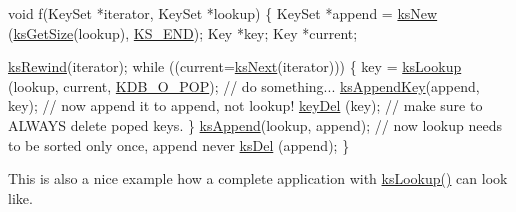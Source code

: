 \begin{DoxyCodeInclude}
\textcolor{keywordtype}{void} f(KeySet *iterator, KeySet *lookup)
\{
        KeySet *append = \hyperlink{group__keyset_ga671e1aaee3ae9dc13b4834a4ddbd2c3c}{ksNew} (\hyperlink{group__keyset_ga7474ad6b0a0fa969dbdf267ba5770eee}{ksGetSize}(lookup), \hyperlink{kdbenum_8c_a7a28fce3773b2c873c94ac80b8b4cd54}{KS\_END});
        Key *key;
        Key *current;

        \hyperlink{group__keyset_gabe793ff51f1728e3429c84a8a9086b70}{ksRewind}(iterator);
        \textcolor{keywordflow}{while} ((current=\hyperlink{group__keyset_ga317321c9065b5a4b3e33fe1c399bcec9}{ksNext}(iterator)))
        \{
                key = \hyperlink{group__keyset_gaa34fc43a081e6b01e4120daa6c112004}{ksLookup} (lookup, current, \hyperlink{group__keyset_gga98a3d6a4016c9dad9cbd1a99a9c2a45aa52fb5f2cc86773d393da62bebebf7984}{KDB\_O\_POP});
                \textcolor{comment}{// do something...}
                \hyperlink{group__keyset_gaa5a1d467a4d71041edce68ea7748ce45}{ksAppendKey}(append, key); \textcolor{comment}{// now append it to append, not lookup!}
                \hyperlink{group__key_ga3df95bbc2494e3e6703ece5639be5bb1}{keyDel} (key); \textcolor{comment}{// make sure to ALWAYS delete poped keys.}
        \}
        \hyperlink{group__keyset_ga21eb9c3a14a604ee3a8bdc779232e7b7}{ksAppend}(lookup, append);
        \textcolor{comment}{// now lookup needs to be sorted only once, append never}
        \hyperlink{group__keyset_ga27e5c16473b02a422238c8d970db7ac8}{ksDel} (append);
\}
\end{DoxyCodeInclude}
 This is also a nice example how a complete application with \hyperlink{group__keyset_gaa34fc43a081e6b01e4120daa6c112004}{ks\+Lookup()} can look like.

